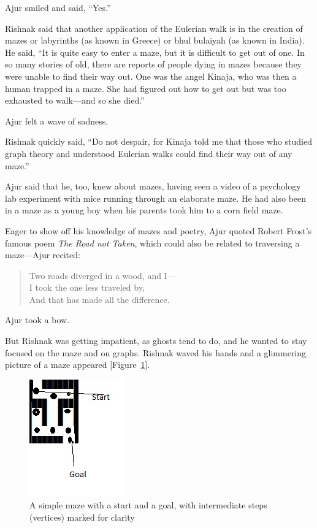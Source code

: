 Ajur smiled and said, ``Yes.''

Rishnak said that another application of the Eulerian walk is in the creation of mazes or labyrinths (as known in Greece) or bhul bulaiyah (as known in India).  He said, ``It is quite easy to enter a maze, but it is difficult to get out of one. In so many stories of old, there are reports of people dying in mazes because they were unable to find their way out. One was the angel Kinaja, who was then a human trapped in a maze. She had figured out how to get out but was too exhausted to walk---and so she died.''

Ajur felt a wave of sadness.

Rishnak quickly said, ``Do not despair, for Kinaja told me that those who studied graph theory and understood Eulerian walks could find their way out of any maze.''

Ajur said that he, too, knew about mazes, having seen a video of a psychology lab experiment with mice running through an elaborate maze. He had also been in a maze as a young boy when his parents took him to a corn field maze.

Eager to show off his knowledge of mazes and poetry, Ajur quoted  Robert Frost's famous poem \textit{The Road not Taken}, which could also be related to traversing a maze---Ajur recited: \begin{quotation}\noindent Two roads diverged in a wood, and I--- \\ 
I took the one less traveled by, \\
And that has made all the difference.
\end{quotation}

\noindent Ajur took a bow.

But Rishnak was getting impatient, as ghosts tend to do, and he wanted to stay focused on the maze and on graphs. Rishnak waved his hands and a glimmering picture of a maze appeared [Figure~\ref{4g7}].

\begin{figure}
\begin{center}
\includegraphics{maze11.jpg}
\caption{A simple maze with a start and a goal, with intermediate steps (vertices) marked for clarity}\label{4g7}
\end{center}
\end{figure}

